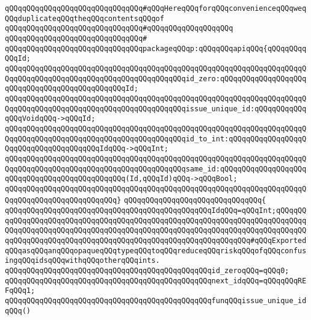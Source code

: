 \verb|qQQqqQQqqQQqqQQqqQQqqQQqqQQqqQQq#qQQqHereqQQqforqQQqconvenienceqQQqweqQQqduplicateqQQqtheqQQqcontentsqQQqof|\newline
\verb|qQQqqQQqqQQqqQQqqQQqqQQqqQQqqQQq#qQQqqQQqqQQqqQQqqQQq|\newline
\verb|qQQqqQQqqQQqqQQqqQQqqQQqqQQqqQQq#|\newline
\verb|qQQqqQQqqQQqqQQqqQQqqQQqqQQqqQQqpackageqQQqp:qQQqqQQqapiqQQq{qQQqqQQqqQQqId;|\newline
\verb|qQQqqQQqqQQqqQQqqQQqqQQqqQQqqQQqqQQqqQQqqQQqqQQqqQQqqQQqqQQqqQQqqQQqqQQqqQQqqQQqqQQqqQQqqQQqqQQqqQQqqQQqqQQqqQQqid_zero:qQQqqQQqqQQqqQQqqQQqqQQqqQQqqQQqqQQqqQQqqQQqqQQqId;|\newline
\verb|qQQqqQQqqQQqqQQqqQQqqQQqqQQqqQQqqQQqqQQqqQQqqQQqqQQqqQQqqQQqqQQqqQQqqQQqqQQqqQQqqQQqqQQqqQQqqQQqqQQqqQQqqQQqqQQqissue_unique_id:qQQqqQQqqQQqqQQqVoidqQQq->qQQqId;|\newline
\verb|qQQqqQQqqQQqqQQqqQQqqQQqqQQqqQQqqQQqqQQqqQQqqQQqqQQqqQQqqQQqqQQqqQQqqQQqqQQqqQQqqQQqqQQqqQQqqQQqqQQqqQQqqQQqqQQqid_to_int:qQQqqQQqqQQqqQQqqQQqqQQqqQQqqQQqqQQqqQQqIdqQQq->qQQqInt;|\newline
\verb|qQQqqQQqqQQqqQQqqQQqqQQqqQQqqQQqqQQqqQQqqQQqqQQqqQQqqQQqqQQqqQQqqQQqqQQqqQQqqQQqqQQqqQQqqQQqqQQqqQQqqQQqqQQqqQQqsame_id:qQQqqQQqqQQqqQQqqQQqqQQqqQQqqQQqqQQqqQQqqQQqqQQq(Id,qQQqId)qQQq->qQQqBool;|\newline
\verb|qQQqqQQqqQQqqQQqqQQqqQQqqQQqqQQqqQQqqQQqqQQqqQQqqQQqqQQqqQQqqQQqqQQqqQQqqQQqqQQqqQQqqQQqqQQqqQQq}|\newline
\verb|qQQqqQQqqQQqqQQqqQQqqQQqqQQqqQQq{|\newline
\verb|qQQqqQQqqQQqqQQqqQQqqQQqqQQqqQQqqQQqqQQqqQQqqQQqIdqQQq=qQQqInt;qQQqqQQqqQQqqQQqqQQqqQQqqQQqqQQqqQQqqQQqqQQqqQQqqQQqqQQqqQQqqQQqqQQqqQQqqQQqqQQqqQQqqQQqqQQqqQQqqQQqqQQqqQQqqQQqqQQqqQQqqQQqqQQqqQQqqQQqqQQqqQQqqQQqqQQqqQQqqQQqqQQqqQQqqQQqqQQqqQQqqQQqqQQqqQQqqQQqqQQqqQQq#qQQqExportedqQQqasqQQqanqQQqopaqueqQQqtypeqQQqtoqQQqreduceqQQqriskqQQqofqQQqconfusingqQQqidsqQQqwithqQQqotherqQQqints.|\newline
\verb|qQQqqQQqqQQqqQQqqQQqqQQqqQQqqQQqqQQqqQQqqQQqqQQqid_zeroqQQq=qQQq0;|\newline
\newline
\verb|qQQqqQQqqQQqqQQqqQQqqQQqqQQqqQQqqQQqqQQqqQQqqQQqnext_idqQQq=qQQqqQQqREFqQQq1;|\newline
\newline
\verb|qQQqqQQqqQQqqQQqqQQqqQQqqQQqqQQqqQQqqQQqqQQqqQQqfunqQQqissue_unique_idqQQq()|\newline
